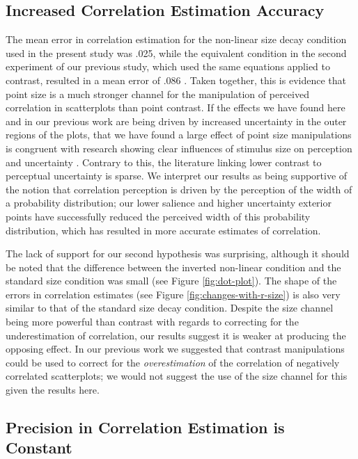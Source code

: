 \documentclass{vgtc}                          %
\begin{document}
\hypertarget{increased-correlation-estimation-accuracy}{%
\subsection{Increased Correlation Estimation Accuracy}\label{increased-correlation-estimation-accuracy}}

The mean error in correlation estimation for the non-linear size decay condition used
in the present study was .025, while the equivalent condition in the second experiment
of our previous study, which used the same equations applied to contrast, resulted
in a mean error of .086 \cite{strain_2023}. Taken together, this is evidence that point
size is a much stronger channel for the manipulation of perceived correlation in
scatterplots than point contrast. If the effects we have found here and in our
previous work are being driven by increased uncertainty in the outer regions of the plots,
that we have found a large effect of point size manipulations is congruent
with research showing clear influences of stimulus size on perception and uncertainty
\cite{hong_2021, grice_1983, alais_2004}. Contrary to this, the literature linking
lower contrast to perceptual uncertainty is sparse. We interpret our results
as being supportive of the notion that correlation perception is driven
by the perception of the width of a probability distribution; our lower salience
and higher uncertainty exterior points have successfully reduced the perceived width
of this probability distribution, which has resulted in more accurate estimates
of correlation.

The lack of support for our second hypothesis was surprising, although it should
be noted that the difference between the inverted non-linear condition and the standard size
condition was small (see Figure \ref{fig:dot-plot}). The shape of the errors
in correlation estimates (see Figure \ref{fig:changes-with-r-size}) is also
very similar to that of the standard size decay condition. Despite the size channel
being more powerful than contrast with regards to correcting
for the underestimation of correlation, our results suggest it is weaker at
producing the opposing effect. In our previous work we suggested that contrast
manipulations could be used to correct for the \emph{overestimation} of the correlation
of negatively correlated scatterplots; we would not suggest the use of the size
channel for this given the results here.

\hypertarget{precision-in-correlation-estimation-is-constant}{%
\subsection{Precision in Correlation Estimation is Constant}\label{precision-in-correlation-estimation-is-constant}}
\end{document}
